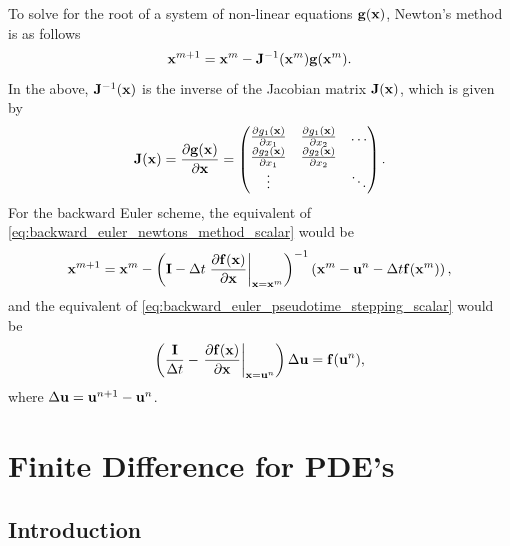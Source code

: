 \documentclass[oneside,a4paper,11pt]{report}
\begin{document}
To solve for the root of a system of non-linear equations $\mathbf{g}(\mathbf{x})$, Newton's method is as follows
\begin{equation}
    \mathbf{x}^{m+1} = \mathbf{x}^m - \mathbf{J}^{-1}(\mathbf{x}^m) \mathbf{g}(\mathbf{x}^m). 
\end{equation}
In the above, $\mathbf{J}^{-1}(\mathbf{x})$ is the inverse of the Jacobian matrix $\mathbf{J}(\mathbf{x})$, which is given by
\begin{equation}
    \mathbf{J}(\mathbf{x}) = \frac{\partial \mathbf{g}(\mathbf{x})}{\partial \mathbf{x}} = \begin{pmatrix} 
    \frac{\partial g_1(\mathbf{x})}{\partial x_1} & \frac{\partial g_1(\mathbf{x})}{\partial x_2} & \dots \\
    \frac{\partial g_2(\mathbf{x})}{\partial x_1} & \frac{\partial g_2(\mathbf{x})}{\partial x_2} & \\
    \vdots &        & \ddots
    \end{pmatrix}.
\end{equation}
For the backward Euler scheme, the equivalent of \cref{eq:backward_euler_newtons_method_scalar} would be
\begin{equation}
\label{eq:backward_euler_newtons_method_system}
    \mathbf{x}^{m+1} = \mathbf{x}^m - \left ( \mathbf{I} - \Delta t \left . \frac{\partial \mathbf{f}(\mathbf{x})}{\partial \mathbf{x}} \right |_{\mathbf{x} = \mathbf{x}^m} \right )^{-1} \left ( \mathbf{x}^m - \mathbf{u}^n - \Delta t \mathbf{f}(\mathbf{x}^m) \right ),
\end{equation}
and the equivalent of \cref{eq:backward_euler_pseudotime_stepping_scalar} would be
\begin{equation}
\label{eq:backward_euler_pseudotime_stepping_system}
    \left ( \frac{\mathbf{I}}{\Delta t} - \left . \frac{\partial \mathbf{f}(\mathbf{x})}{\partial \mathbf{x}} \right |_{\mathbf{x} = \mathbf{u}^n} \right ) \Delta \mathbf{u} = \mathbf{f}(\mathbf{u}^n),
\end{equation}
where $\Delta \mathbf{u} = \mathbf{u}^{n+1} - \mathbf{u}^n$.


\part{Finite Difference for PDE's}

\chapter{Introduction}
\end{document}
